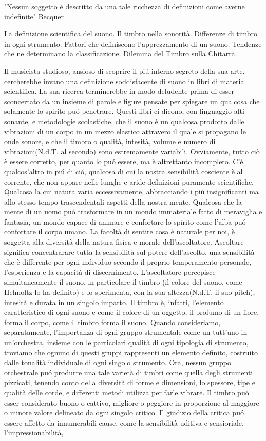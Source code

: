 \documentclass[
10pt, %
a4paper, %
oneside, %
headinclude,footinclude, %
BCOR5mm, %
]{scrartcl}
\begin{document}
\par{"Nessun soggetto è descritto da una tale ricchezza di definizioni come averne indefinite" Becquer

La definizione scientifica del suono. Il timbro nella sonorità. Differenze di timbro in ogni strumento. Fattori che definiscono l'apprezzamento di un suono. Tendenze che ne determinano la classificazione. Dilemma del Timbro sulla Chitarra.

Il musicista studioso, ansioso di scoprire il piú interno segreto della sua arte, cercherebbe invano una definizione soddisfacente di suono in libri di materia scientifica. La sua ricerca terminerebbe in modo deludente prima di esser sconcertato da un insieme di parole e figure pensate per spiegare un qualcosa che solamente lo spirito puó penetrare. Questi libri ci dicono, con linguaggio alti-sonante, e metodologie scolastiche, che il suono è un qualcosa prodotto dalle vibrazioni di un corpo in un mezzo elastico attravero il quale si propagano le onde sonore, e che il timbro o qualità, intesità, volume e numero di vibrazioni(N.d.T. al secondo) sono estremamente variabili. Ovviamente, tutto ciò è essere corretto, per quanto lo puó essere, ma è altrettanto incompleto. C'è qualcos'altro in piú di ció, qualcosa di cui la nostra sensibilità cosciente è al corrente, che non appare nelle lunghe e aride definizioni puramente scientifiche. Qualcosa la cui natura varia eccessivamente, abbracciando i piú insignificanti ma allo stesso tempo trascendentali aspetti della nostra mente. Qualcosa che la mente di un uomo puó trasformare in un mondo immateriale fatto di meraviglia e fantasia, un mondo capace di animare e confortare lo spirito come l'alba puó confortare il corpo umano. La facoltà di sentire cosa è naturale per noi, è soggetta alla diversità della natura fisica e morale dell'ascoltatore. Ascoltare significa concentrarare tutta la sensibilità sul potere dell'ascolto, una sensibilità che è differente per ogni individuo secondo il proprio temperamento personale, l'esperienza e la capacità di discernimento. L'ascoltatore percepisce simultaneamente il suono, in particolare il timbro (il colore del suono, come Helmoltz lo ha definito) e lo sperimenta, con la sua altezza(N.d.T. il suo pitch), intesità e durata in un singolo impatto. Il timbro è, infatti, l'elemento caratteristico di ogni suono e come il colore di un oggetto, il profumo di un fiore, forma il corpo, come il timbro forma il suono. Quando consideriamo, separatamente, l'importanza di ogni gruppo strumentale come un tutt'uno in un'orchestra, insieme con le particolari qualità di ogni tipologia di strumento, troviamo che ognuno di questi gruppi rappresenti un elemento definito, costruito dalle tonalità individuale di ogni singolo strumento. Ora, nessun gruppo orchestrale puó produrre una tale varietà di timbri come quella degli strumenti pizzicati, tenendo conto della diversità di forme e dimensioni, lo spessore, tipe e qualità delle corde, e differenti metodi utilizza per farle vibrare. Il timbro puó esser considerato buono o cattivo, migliore o peggiore in proporzione al maggiore o minore valore delineato da ogni singolo critico. Il giudizio della critica puó essere affetto da innumerabili cause, come la sensibilità uditiva e sensioriale, l'impressionabilità, }
\end{document}
